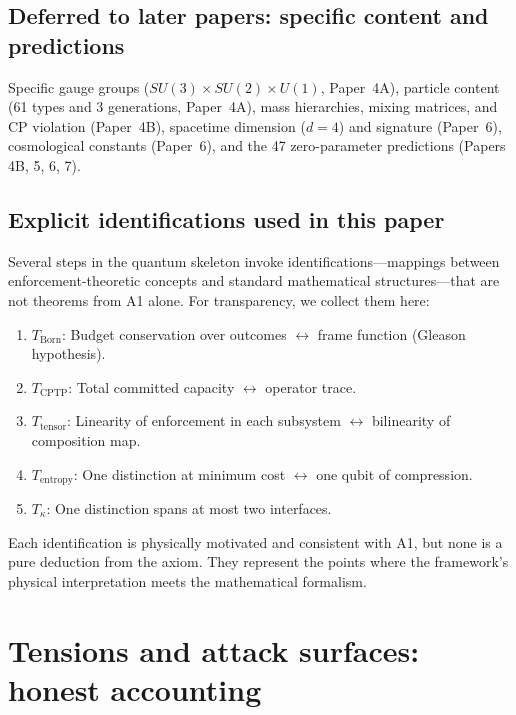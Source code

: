 \documentclass[11pt]{article}
\begin{document}
\subsection{Deferred to later papers: specific content and predictions}

Specific gauge groups ($SU(3) \times SU(2) \times U(1)$, Paper~4A), particle content (61 types and 3 generations, Paper~4A), mass hierarchies, mixing matrices, and CP violation (Paper~4B), spacetime dimension ($d=4$) and signature (Paper~6), cosmological constants (Paper~6), and the 47 zero-parameter predictions (Papers 4B, 5, 6, 7).

\subsection{Explicit identifications used in this paper}

Several steps in the quantum skeleton invoke identifications---mappings between enforcement-theoretic concepts and standard mathematical structures---that are not theorems from A1 alone.  For transparency, we collect them here:

\begin{enumerate}
  \item \textit{$T_{\mathrm{Born}}$}: Budget conservation over outcomes $\leftrightarrow$ frame function (Gleason hypothesis).
  \item \textit{$T_{\mathrm{CPTP}}$}: Total committed capacity $\leftrightarrow$ operator trace.
  \item \textit{$T_{\mathrm{tensor}}$}: Linearity of enforcement in each subsystem $\leftrightarrow$ bilinearity of composition map.
  \item \textit{$T_{\mathrm{entropy}}$}: One distinction at minimum cost $\leftrightarrow$ one qubit of compression.
  \item \textit{$T_\kappa$}: One distinction spans at most two interfaces.
\end{enumerate}

Each identification is physically motivated and consistent with A1, but none is a pure deduction from the axiom.  They represent the points where the framework's physical interpretation meets the mathematical formalism.


\section{Tensions and attack surfaces: honest accounting}
\end{document}
